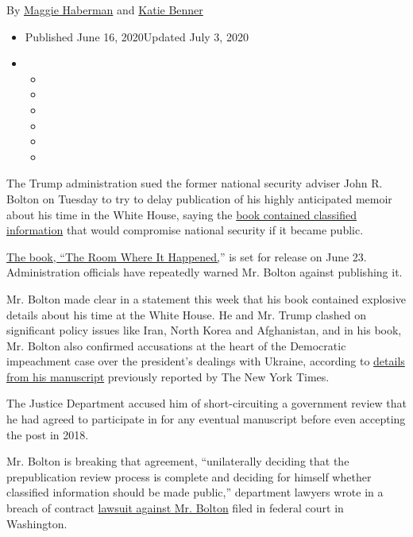 By \href{https://www.nytimes.com/by/maggie-haberman}{Maggie Haberman}
and \href{https://www.nytimes.com/by/katie-benner}{Katie Benner}

\begin{itemize}
\item
  Published June 16, 2020Updated July 3, 2020
\item
  \begin{itemize}
  \item
  \item
  \item
  \item
  \item
  \item
  \end{itemize}
\end{itemize}

The Trump administration sued the former national security adviser John
R. Bolton on Tuesday to try to delay publication of his highly
anticipated memoir about his time in the White House, saying the
\href{https://www.nytimes.com/2020/06/17/us/politics/bolton-book-trump-impeached.html}{book
contained classified information} that would compromise national
security if it became public.

\href{https://www.nytimes.com/2020/06/17/books/review-room-where-it-happened-john-bolton-memoir.html}{The
book, ``The Room Where It Happened,}'' is set for release on June 23.
Administration officials have repeatedly warned Mr. Bolton against
publishing it.

Mr. Bolton made clear in a statement this week that his book contained
explosive details about his time at the White House. He and Mr. Trump
clashed on significant policy issues like Iran, North Korea and
Afghanistan, and in his book, Mr. Bolton also confirmed accusations at
the heart of the Democratic impeachment case over the president's
dealings with Ukraine, according to
\href{https://www.nytimes.com/2020/01/31/us/politics/trump-bolton-ukraine.html}{details
from his manuscript} previously reported by The New York Times.

The Justice Department accused him of short-circuiting a government
review that he had agreed to participate in for any eventual manuscript
before even accepting the post in 2018.

Mr. Bolton is breaking that agreement, ``unilaterally deciding that the
prepublication review process is complete and deciding for himself
whether classified information should be made public,'' department
lawyers wrote in a breach of contract
\href{https://int.nyt.com/data/documenthelper/7030-john-bolton-lawsuit/ce3b8c4bf5f6687fa454/optimized/full.pdf\#page=1}{lawsuit
against Mr. Bolton} filed in federal court in Washington.

